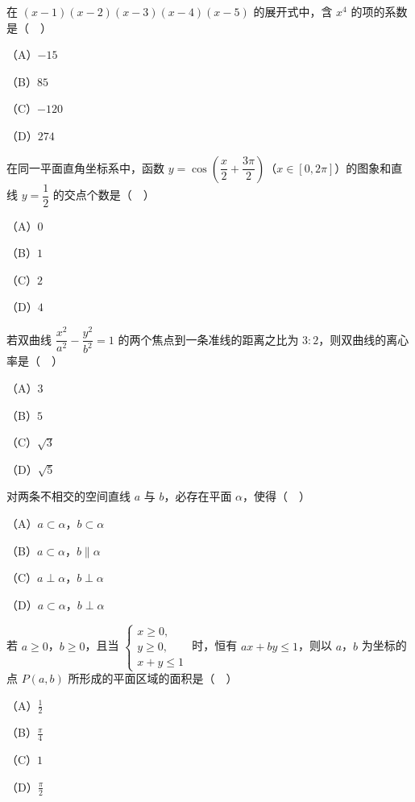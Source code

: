 \begin{question}
在 $(x-1)(x-2)(x-3)(x-4)(x-5)$ 的展开式中，含 $x^4$ 的项的系数是（　）

（A）$-15$

（B）$85$

（C）$-120$

（D）$274$

\end{question}
\begin{question}
在同一平面直角坐标系中，函数 $y=\cos\left(\dfrac x2+\dfrac{3\pi}2\right)$（$x\in[0,2\pi]$）的图象和直线 $y=\dfrac12$ 的交点个数是（　）

（A）$0$

（B）$1$

（C）$2$

（D）$4$

\end{question}
\begin{question}
若双曲线 $\dfrac{x^2}{a^2}-\dfrac{y^2}{b^2}=1$ 的两个焦点到一条准线的距离之比为 $3:2$，则双曲线的离心率是（　）

（A）$3$

（B）$5$

（C）$\sqrt3$

（D）$\sqrt5$

\end{question}
\begin{question}
对两条不相交的空间直线 $a$ 与 $b$，必存在平面 $\alpha$，使得（　）

（A）$a\subset\alpha$，$b\subset\alpha$

（B）$a\subset\alpha$，$b\parallel\alpha$

（C）$a\perp\alpha$，$b\perp\alpha$

（D）$a\subset\alpha$，$b\perp\alpha$

\end{question}
\begin{question}
若 $a\geqslant0$，$b\geqslant0$，且当 $\begin{cases}x\geqslant0,\\ y\geqslant0,\\ x+y\leqslant1\end{cases}$ 时，恒有 $ax+by\leqslant1$，则以 $a$，$b$ 为坐标的点 $P(a,b)$ 所形成的平面区域的面积是（　）

（A）$\frac12$

（B）$\frac{\pi}4$

（C）$1$

（D）$\frac{\pi}2$

\end{question}


